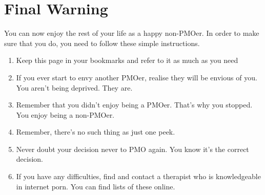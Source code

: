 \documentclass[easypeasy.tex]{subfiles}
\begin{document}
\section{Final Warning}

You can now enjoy the rest of your life as a happy non-PMOer. In order to make sure that you do, you need to follow these simple instructions.
\begin{enumerate}
  \item Keep this page in your bookmarks and refer to it as much as you need
  \item If you ever start to envy another PMOer, realise they will be envious of you. You aren't being deprived. They are.
  \item Remember that you didn't enjoy being a PMOer. That's why you stopped. You enjoy being a non-PMOer.
  \item Remember, there's no such thing as just one peek.
  \item Never doubt your decision never to PMO again. You know it's the correct decision.
  \item If you have any difficulties, find and contact a therapist who is knowledgeable in internet porn. You can find lists of these online.
\end{enumerate}
\end{document}
